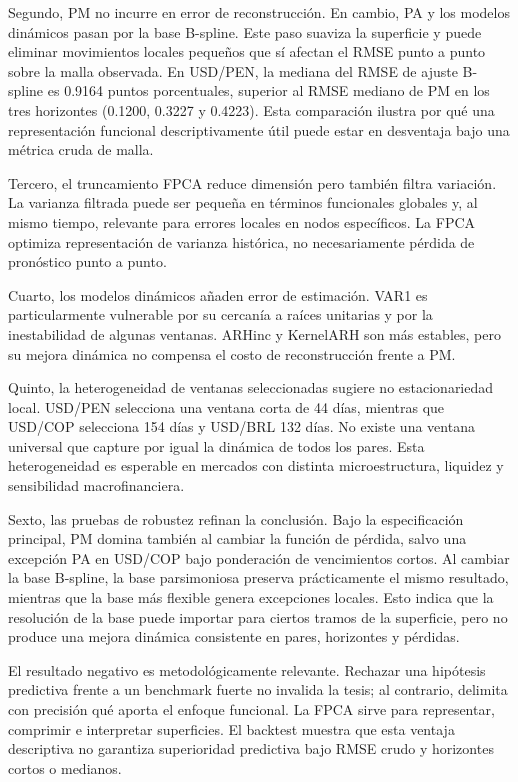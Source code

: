 \documentclass[a4paper,11pt]{article}
\begin{document}
Segundo, PM no incurre en error de reconstrucción. En cambio, PA y los modelos dinámicos pasan por la base B-spline. Este paso suaviza la superficie y puede eliminar movimientos locales pequeños que sí afectan el RMSE punto a punto sobre la malla observada. En USD/PEN, la mediana del RMSE de ajuste B-spline es 0.9164 puntos porcentuales, superior al RMSE mediano de PM en los tres horizontes (0.1200, 0.3227 y 0.4223). Esta comparación ilustra por qué una representación funcional descriptivamente útil puede estar en desventaja bajo una métrica cruda de malla.

Tercero, el truncamiento FPCA reduce dimensión pero también filtra variación. La varianza filtrada puede ser pequeña en términos funcionales globales y, al mismo tiempo, relevante para errores locales en nodos específicos. La FPCA optimiza representación de varianza histórica, no necesariamente pérdida de pronóstico punto a punto.

Cuarto, los modelos dinámicos añaden error de estimación. VAR1 es particularmente vulnerable por su cercanía a raíces unitarias y por la inestabilidad de algunas ventanas. ARHinc y KernelARH son más estables, pero su mejora dinámica no compensa el costo de reconstrucción frente a PM.

Quinto, la heterogeneidad de ventanas seleccionadas sugiere no estacionariedad local. USD/PEN selecciona una ventana corta de 44 días, mientras que USD/COP selecciona 154 días y USD/BRL 132 días. No existe una ventana universal que capture por igual la dinámica de todos los pares. Esta heterogeneidad es esperable en mercados con distinta microestructura, liquidez y sensibilidad macrofinanciera.

Sexto, las pruebas de robustez refinan la conclusión. Bajo la especificación principal, PM domina también al cambiar la función de pérdida, salvo una excepción PA en USD/COP bajo ponderación de vencimientos cortos. Al cambiar la base B-spline, la base parsimoniosa preserva prácticamente el mismo resultado, mientras que la base más flexible genera excepciones locales. Esto indica que la resolución de la base puede importar para ciertos tramos de la superficie, pero no produce una mejora dinámica consistente en pares, horizontes y pérdidas.

El resultado negativo es metodológicamente relevante. Rechazar una hipótesis predictiva frente a un benchmark fuerte no invalida la tesis; al contrario, delimita con precisión qué aporta el enfoque funcional. La FPCA sirve para representar, comprimir e interpretar superficies. El backtest muestra que esta ventaja descriptiva no garantiza superioridad predictiva bajo RMSE crudo y horizontes cortos o medianos.
\end{document}
